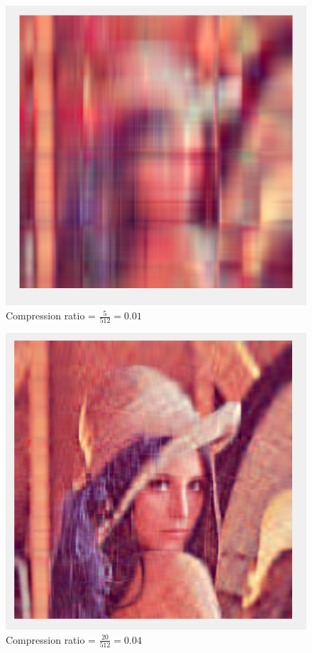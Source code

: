 \documentclass[11pt]{article}
\begin{document}
\begin{figure}[!h]
\centering
	\caption{Compression ratio = $\frac{5}{512} = 0.01$}
	\includegraphics[scale=.6]{lenna_5}
\end{figure}

\begin{figure}[!h]
\centering
	\caption{Compression ratio = $\frac{20}{512} = 0.04$}
	\includegraphics[scale=.6]{lenna_20}
\end{figure}
\end{document}
